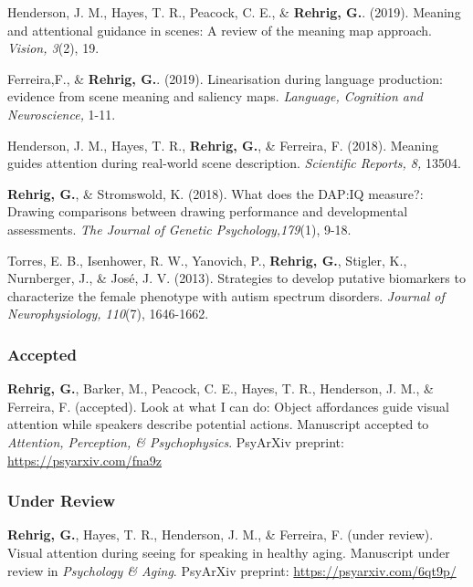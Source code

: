 Henderson, J. M., Hayes, T. R., Peacock, C. E., \& \textbf{Rehrig, G.}. (2019). Meaning and attentional guidance in scenes: A review of the meaning map approach. \textit{Vision, 3}(2), 19.


Ferreira,F., \& \textbf{Rehrig, G.}. (2019). Linearisation during language production: evidence from scene meaning and saliency maps. \textit{Language, Cognition and Neuroscience,} 1-11.


Henderson, J. M., Hayes, T. R., \textbf{Rehrig, G.}, \& Ferreira, F. (2018). Meaning guides attention during real-world scene description. \textit{Scientific Reports, 8,} 13504. 


\textbf{Rehrig, G.}, \& Stromswold, K. (2018). What does the DAP:IQ measure?: Drawing comparisons between drawing performance and developmental assessments. \textit{The Journal of Genetic Psychology,179}(1), 9-18.


Torres, E. B., Isenhower, R. W., Yanovich, P., \textbf{Rehrig, G.}, Stigler, K., Nurnberger, J., \& Jos\'e, J. V. (2013). Strategies to develop putative biomarkers to characterize the female phenotype with autism spectrum disorders. \textit{Journal of Neurophysiology, 110}(7), 1646-1662.

\subsubsection*{Accepted}

\textbf{Rehrig, G.}, Barker, M., Peacock, C. E., Hayes, T. R., Henderson, J. M., \& Ferreira, F. (accepted). Look at what I can do: Object affordances guide visual attention while speakers describe potential actions. Manuscript accepted to \textit{Attention, Perception, \& Psychophysics}. PsyArXiv preprint: \url{https://psyarxiv.com/fna9z}


\subsubsection*{Under Review}

\textbf{Rehrig, G.}, Hayes, T. R., Henderson, J. M., \& Ferreira, F. (under review). Visual attention during seeing for speaking in healthy aging. Manuscript under review in \textit{Psychology \& Aging}. PsyArXiv preprint: \url{https://psyarxiv.com/6qt9p/}

